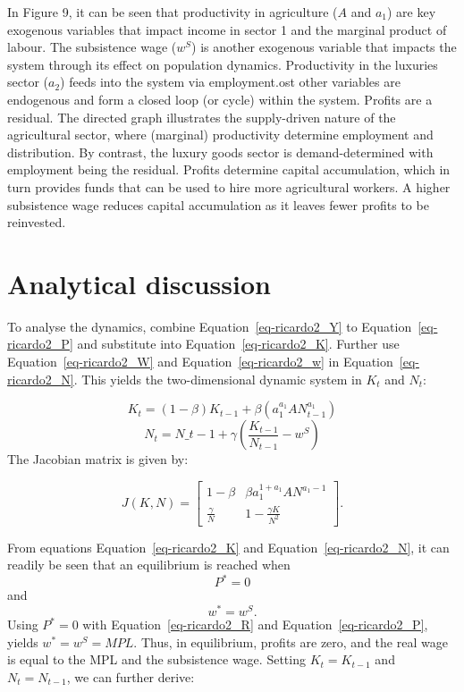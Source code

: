 \documentclass[
  letterpaper,
  DIV=11,
  numbers=noendperiod]{scrreprt}
\begin{document}
In Figure 9, it can be seen that productivity in agriculture (\(A\) and
\(a_1\)) are key exogenous variables that impact income in sector 1 and
the marginal product of labour. The subsistence wage (\(w^S\)) is
another exogenous variable that impacts the system through its effect on
population dynamics. Productivity in the luxuries sector (\(a_2\)) feeds
into the system via employment.ost other variables are endogenous and
form a closed loop (or cycle) within the system. Profits are a residual.
The directed graph illustrates the supply-driven nature of the
agricultural sector, where (marginal) productivity determine employment
and distribution. By contrast, the luxury goods sector is
demand-determined with employment being the residual. Profits determine
capital accumulation, which in turn provides funds that can be used to
hire more agricultural workers. A higher subsistence wage reduces
capital accumulation as it leaves fewer profits to be reinvested.

\section{Analytical discussion}\label{analytical-discussion-9}

To analyse the dynamics, combine Equation~\ref{eq-ricardo2_Y} to
Equation~\ref{eq-ricardo2_P} and substitute into
Equation~\ref{eq-ricardo2_K}. Further use Equation~\ref{eq-ricardo2_W}
and Equation~\ref{eq-ricardo2_w} in Equation~\ref{eq-ricardo2_N}. This
yields the two-dimensional dynamic system in \(K_t\) and \(N_t\):

\[
K_t = (1-\beta)K_{t-1}+\beta(a_1^{a_1}A N_{t-1}^{a_1} )
\] \[ 
N_t = N\_{t-1} +\gamma\left(\frac{K_{t-1}}{N_{t-1}} -w^S\right)
\] The Jacobian matrix is given by:

\[
J(K, N)=\begin{bmatrix} 1-\beta& \beta a_1^{1+a_1}AN^{a_1-1} \\\frac{\gamma}{N} & 1-\frac{\gamma K}{N^2} \end{bmatrix}.
\]

From equations Equation~\ref{eq-ricardo2_K} and
Equation~\ref{eq-ricardo2_N}, it can readily be seen that an equilibrium
is reached when \[
P^*=0
\] and \[
w^*=w^S.
\] Using \(P^*=0\) with Equation~\ref{eq-ricardo2_R} and
Equation~\ref{eq-ricardo2_P}, yields \(w^*=w^S=MPL\). Thus, in
equilibrium, profits are zero, and the real wage is equal to the MPL and
the subsistence wage. Setting \(K_t=K_{t-1}\) and \(N_t=N_{t-1}\), we
can further derive:
\end{document}
